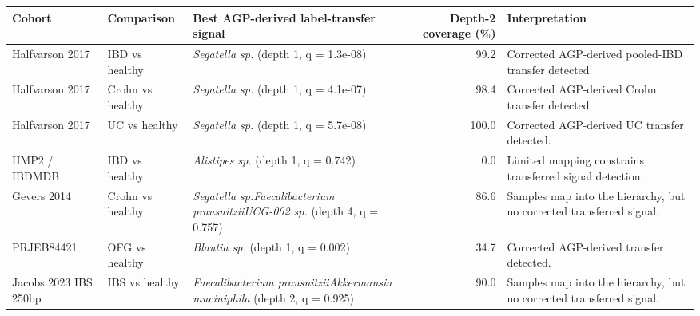 \begin{center}
\footnotesize
\begin{tabularx}{\textwidth}{@{} l l Y r Y @{}}
\toprule
Cohort & Comparison & Best AGP-derived label-transfer signal & Depth-2 coverage (\%) & Interpretation
 \\
\midrule
Halfvarson 2017 & IBD vs healthy & \emph{Segatella sp.} (depth 1, q = 1.3e-08) & 99.2 & Corrected AGP-derived pooled-IBD transfer detected. \\
Halfvarson 2017 & Crohn vs healthy & \emph{Segatella sp.} (depth 1, q = 4.1e-07) & 98.4 & Corrected AGP-derived Crohn transfer detected. \\
Halfvarson 2017 & UC vs healthy & \emph{Segatella sp.} (depth 1, q = 5.7e-08) & 100.0 & Corrected AGP-derived UC transfer detected. \\
HMP2 / IBDMDB & IBD vs healthy & \emph{Alistipes sp.} (depth 1, q = 0.742) & 0.0 & Limited mapping constrains transferred signal detection. \\
Gevers 2014 & Crohn vs healthy & \emph{Segatella sp.}\dcstsep \emph{Faecalibacterium prausnitzii}\dcstsep \emph{UCG-002 sp.} (depth 4, q = 0.757) & 86.6 & Samples map into the hierarchy, but no corrected transferred signal. \\
PRJEB84421 & OFG vs healthy & \emph{Blautia sp.} (depth 1, q = 0.002) & 34.7 & Corrected AGP-derived transfer detected. \\
Jacobs 2023 IBS 250bp & IBS vs healthy & \emph{Faecalibacterium prausnitzii}\dcstsep \emph{Akkermansia muciniphila} (depth 2, q = 0.925) & 90.0 & Samples map into the hierarchy, but no corrected transferred signal. \\
\bottomrule
\end{tabularx}
\end{center}
